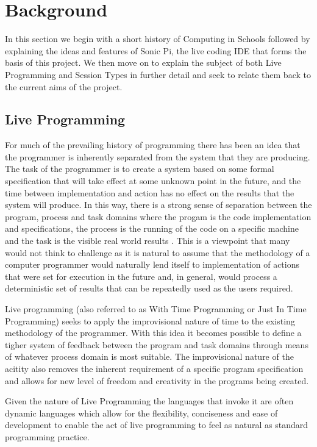 \documentclass[11pt, abstracton, twoside, titlepage=true]{scrartcl}
\begin{document}
\section{Background}
\thispagestyle{empty}
In this section we begin with a short history of Computing in Schools followed 
by explaining the ideas and features of Sonic Pi, the live coding IDE that forms 
the basis of this project. We then move on to explain the subject of both Live 
Programming and Session Types in further detail and seek to relate them back to 
the current aims of the project.

\subsection{Live Programming}
For much of the prevailing history of programming there has been an idea that 
the programmer is inherently separated from the system that they are 
producing. The task of the programmer is to create a system based on some 
formal specification that will take effect at some unknown point in the 
future, and the time between implementation and action has no effect on the 
results that the system will produce. In this way, there is a strong sense of 
separation between the program, process and task domains where the progam is 
the code implementation and specifications, the process is the running of the 
code on a specific machine and the task is the visible real world results
\cite{SG10}. This is a viewpoint that many would not think to challenge as it 
is natural to assume that the methodology of a computer programmer would 
naturally lend itself to implementation of actions that were set for execution 
in the future and, in general, would process a deterministic set of results 
that can be repeatedly used as the users required.

Live programming (also referred to as With Time Programming or Just In Time 
Programming) seeks to apply the improvisional nature of time to the existing 
methodology of the programmer. With this idea it becomes possible to define a 
tigher system of feedback between the program and task domains through means 
of whatever process domain is most suitable. The improvisional nature of the 
acitity also removes the inherent requirement of a specific program 
specification and allows for new level of freedom and creativity in the 
programs being created. 

Given the nature of Live Programming the languages that invoke it are often 
dynamic languages which allow for the flexibility, conciseness and ease of 
development \cite{McD07} to enable the act of live programming to feel as 
natural as standard programming practice.
\end{document}
